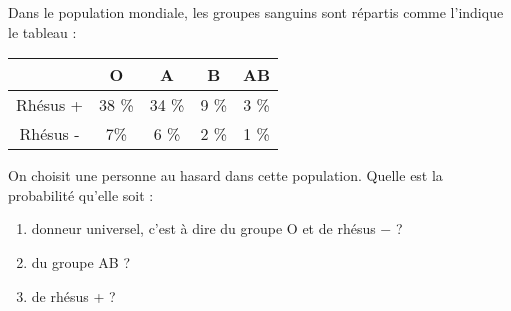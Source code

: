 
Dans le population mondiale, les groupes sanguins sont répartis comme l'indique le tableau :

\begin{tabular}{|c|c|c|c|c|}
\hline 
  & O & A & B & AB \\ 
\hline 
Rhésus + & 38 \% & 34 \% & 9 \% & 3 \% \\ 
\hline 
Rhésus - & 7\% & 6 \% & 2 \% & 1 \% \\ 
\hline 
\end{tabular} 

On choisit une personne au hasard dans cette population. Quelle est la probabilité qu'elle soit :
\begin{enumerate}
\item donneur universel, c'est à dire du groupe O et de rhésus $-$ ?
\item du groupe AB ?
\item de rhésus + ?
\end{enumerate}